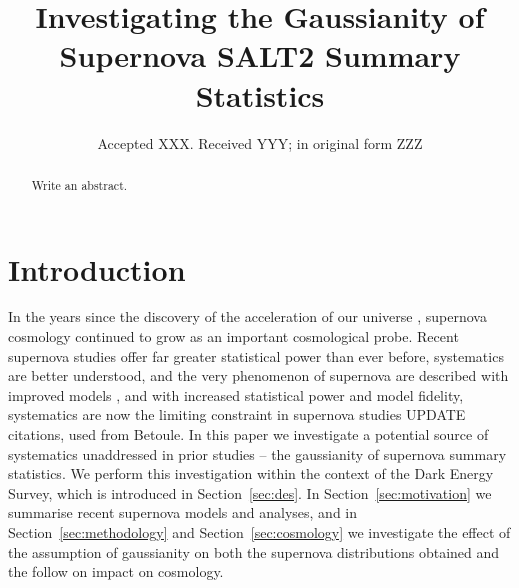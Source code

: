 \documentclass[a4paper,fleqn,usenatbib]{mnras}
\title[Supernova Gaussianity]{Investigating the Gaussianity of Supernova SALT2 Summary Statistics}
\author[S. R. Hinton et al.]{
Samuel R. Hinton,$^{1}$\thanks{E-mail: \href{samuelreay@gmail.com}}
Alex G. Kim,$^{3}$
Tamara M. Davis,$^{1,2}$
Edward Macaulay$^{1,2}$
\\
$^{1}$School of Mathematics and Physics, The University of Queensland, Brisbane, QLD 4072, Australia\\
$^{2}$ARC Centre of Excellence for All-sky Astrophysics (CAASTRO)\\
$^{3}$Physics Division, Lawrence Berkeley National Laboratory, 1 Cyclotron Road, Berkeley, CA 94720, USA
}
\date{Accepted XXX. Received YYY; in original form ZZZ}
\newcommand{\red}{\color{red}}
\begin{document}
\label{firstpage}
\pagerange{\pageref{firstpage}--\pageref{lastpage}}
\maketitle

\begin{abstract}
Write an abstract.
\end{abstract}




\section{Introduction}

In the years since the discovery of the acceleration of our universe \citep{RiessFilippenko1998, SchmidtSuntzeff1998, PerlmutterAldering1999}, supernova cosmology continued to grow as an important cosmological probe. Recent supernova studies offer far greater statistical power than ever before, systematics are better understood, and the very phenomenon of supernova are described with improved models \citep{GuyAstier2007, ConleyGuy2011, BetouleKessler2014, RubinAldering2015}, and with increased statistical power and model fidelity, systematics are now the limiting constraint in supernova studies \citep{ConleyGuy2011, SuzukiRubin2012, ScolnicRest2014} {\red UPDATE citations, used from Betoule}. In this paper we investigate a potential source of systematics unaddressed in prior studies -- the gaussianity of supernova summary statistics. We perform this investigation within the context of the Dark Energy Survey, which is introduced in Section~\ref{sec:des}. In Section~\ref{sec:motivation} we summarise recent supernova models and analyses, and in Section~\ref{sec:methodology} and Section~\ref{sec:cosmology} we investigate the effect of the assumption of gaussianity on both the supernova distributions obtained and the follow on impact on cosmology.
\end{document}
